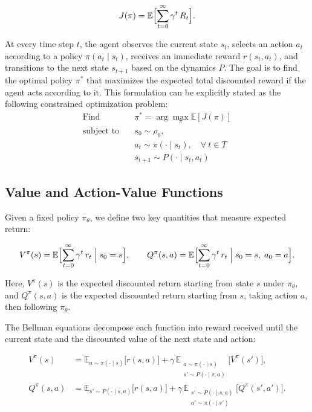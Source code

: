 \[
J(\pi) = \mathbb{E}\Bigl[\sum_{t=0}^\infty \gamma^t\,R_t\Bigr].
\]

At every time step \(t\), the agent observes the current state \(s_t\), selects an action \(a_t\) according to a policy \(\pi(a_t\mid s_t)\), receives an immediate reward \(r(s_t,a_t)\), and transitions to the next state \(s_{t+1}\) based on the dynamics \(P\). The goal is to find the optimal policy \(\pi^*\) that maximizes the expected total discounted reward if the agent acts according to it. This formulation can be explicitly stated as the following constrained optimization problem:
\begin{equation}\label{eq:RL_opt}
\begin{aligned}
\text{Find} \quad & \pi^* = \arg\max_{\pi} \mathbb{E}\left[J(\pi)\right] \\
\text{subject to} \quad & s_0 \sim \rho_0, \\
& a_t \sim \pi(\cdot \mid s_t), \quad \forall\ t \in T \\
& s_{t+1} \sim P(\cdot \mid s_t, a_t)
\end{aligned}
\end{equation}

\subsection{Value and Action-Value Functions}

Given a fixed policy \(\pi_\theta\), we define two key quantities that measure expected return:

\[
V^\pi(s) = \mathbb{E}\Bigl[\sum_{t=0}^{\infty} \gamma^t\,r_t \;\Big|\; s_0 = s\Bigr], 
\qquad
Q^\pi(s,a) = \mathbb{E}\Bigl[\sum_{t=0}^{\infty} \gamma^t\,r_t \;\Big|\; s_0 = s,\; a_0 = a\Bigr].
\]

Here, \(V^\pi(s)\) is the expected discounted return starting from state \(s\) under \(\pi_\theta\), and \(Q^\pi(s,a)\) is the expected discounted return starting from \(s\), taking action \(a\), then following \(\pi_\theta\). 

The Bellman equations decompose each function into reward received until the current state and the discounted value of the next state and action:

\begin{align}
\label{eq:BellmanV}
V^\pi(s)
&= \mathbb{E}_{a\sim\pi(\cdot\mid s)}\bigl[r(s,a)\bigr]
  + \gamma\,\mathbb{E}_{\substack{a\sim\pi(\cdot\mid s)\\s'\sim P(\cdot\mid s,a)}}\bigl[V^\pi(s')\bigr],\\[4pt]
\label{eq:BellmanQ}
Q^\pi(s,a)
&= \mathbb{E}_{s'\sim P(\cdot\mid s,a)}\bigl[r(s,a)\bigr]
  + \gamma\,\mathbb{E}_{\substack{s'\sim P(\cdot\mid s,a)\\a'\sim\pi(\cdot\mid s')}}\bigl[Q^\pi(s',a')\bigr].
\end{align}

